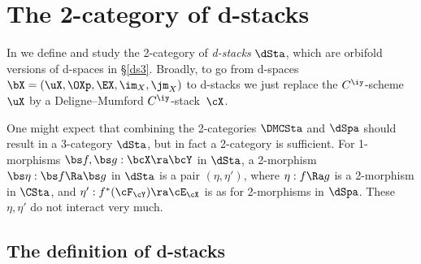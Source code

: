 \documentclass{article}
\begin{document}
\section{The 2-category of d-stacks}
\label{ds10}

In \cite[Chap.~9]{Joyc6} we define and study the 2-category of {\it
d-stacks\/} $\dSta$, which are orbifold versions of d-spaces in
\S\ref{ds3}. Broadly, to go from d-spaces
$\bX=(\uX,\OXp,\EX,\im_X,\jm_X)$ to d-stacks we just replace the
$C^\iy$-scheme $\uX$ by a Deligne--Mumford $C^\iy$-stack~$\cX$.

One might expect that combining the 2-categories $\DMCSta$ and
$\dSpa$ should result in a 3-category $\dSta$, but in fact a
2-category is sufficient. For 1-morphisms $\bs f,\bs g:\bcX\ra\bcY$
in $\dSta$, a 2-morphism $\bs\eta:\bs f\Ra\bs g$ in $\dSta$ is a
pair $(\eta,\eta')$, where $\eta:f\Ra g$ is a 2-morphism in $\CSta$,
and $\eta': f^*(\cF_\cY)\ra\cE_\cX$ is as for 2-morphisms in
$\dSpa$. These $\eta,\eta'$ do not interact very much.

\subsection{The definition of d-stacks}
\label{ds101}
\end{document}
